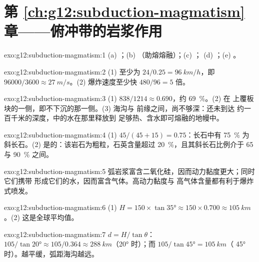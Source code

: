 \section*{第 \ref{ch:g12:subduction-magmatism} 章——俯冲带的岩浆作用}

\begin{solution}{exo:g12:subduction-magmatism:1}
(a) ；(b) （助熔熔融）；(c) ；
(d) ；(e) 。
\end{solution}

\begin{solution}{exo:g12:subduction-magmatism:2}
(1) 至少为 $24/0.25 = \qty{96}{km/h}$，即 $\num{96000}/3600 \approx
\qty{27}{m/s}$。(2) 爆炸速度至少快 $480/96 = 5$ 倍。
\end{solution}

\begin{solution}{exo:g12:subduction-magmatism:3}
(1) $838/1214 \approx 0.690$，约 \qty{69}{\percent}。(2) 在
上覆板块的一侧，即不下沉的那一侧。(3) 海沟与
前缘之间，尚不够深：还未到达
约一百千米的深度，中的水在那里释放到
足够热、含水即可熔融的地幔中。
\end{solution}

\begin{solution}{exo:g12:subduction-magmatism:4}
(1) $45/(45 + 15) = 0.75$：长石中有 \qty{75}{\percent} 为
斜长石。(2) 是的：该岩石为粗粒，石英含量超过
\qty{20}{\percent}，且其斜长石比例介于 65 与
\qty{90}{\percent} 之间。
\end{solution}

\begin{solution}{exo:g12:subduction-magmatism:5}
弧岩浆富含二氧化硅，因而动力黏度更大；同时它们携带
形成它们的水，因而富含气体。高动力黏度与
高气体含量都有利于爆炸式喷发。
\end{solution}

\begin{solution}{exo:g12:subduction-magmatism:6}
(1) $H = 150 \times \tan\ang{35} \approx 150 \times 0.700 \approx
\qty{105}{km}$。(2) 这是全球平均值。
\end{solution}

\begin{solution}{exo:g12:subduction-magmatism:7}
$d = H/\tan\theta$：$105/\tan\ang{20} \approx 105/0.364 \approx
\qty{288}{km}$（\ang{20} 时）；而 $105/\tan\ang{45} = \qty{105}{km}$（
\ang{45} 时）。越平缓，弧距海沟越远。
\end{solution}

